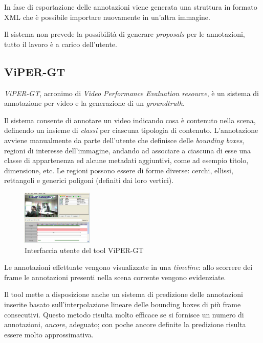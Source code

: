 In fase di esportazione delle annotazioni viene generata una struttura in formato XML che è possibile importare nuovamente in un'altra immagine.

Il sistema non prevede la possibilità di generare \emph{proposals} per le annotazioni, tutto il lavoro è a carico dell'utente.

\subsection{ViPER-GT}

\emph{ViPER-GT}, acronimo di \emph{Video Performance Evaluation resource}, è un sistema di annotazione per video e la generazione di un \emph{groundtruth}. 

Il sistema consente di annotare un video indicando cosa è contenuto nella scena, definendo un insieme di \emph{classi} per ciascuna tipologia di contenuto. L'annotazione avviene manualmente da parte dell'utente che definisce delle \emph{bounding boxes}, regioni di interesse dell'immagine, andando ad associare a ciascuna di esse una classe di appartenenza ed alcune metadati aggiuntivi, come ad esempio titolo, dimensione, etc. Le regioni possono essere di forme diverse: cerchi, ellissi, rettangoli e generici poligoni (definiti dai loro vertici).

\begin{figure}[h]
\begin{center}
\includegraphics[width=0.3\textwidth]{images/vipergt.jpg}
\end{center}
  \caption{Interfaccia utente del tool ViPER-GT}
\label{fig:vipergt}
\end{figure}


Le annotazioni effettuate vengono visualizzate in una \emph{timeline}: allo scorrere dei frame le annotazioni presenti nella scena corrente vengono evidenziate.

Il tool mette a disposizione anche un sistema di predizione delle annotazioni inserite basato sull'interpolazione lineare delle bounding boxes di più frame consecutivi. Questo metodo risulta molto efficace se si fornisce un numero di annotazioni, \emph{ancore}, adeguato; con poche ancore definite la predizione risulta essere molto approssimativa.

